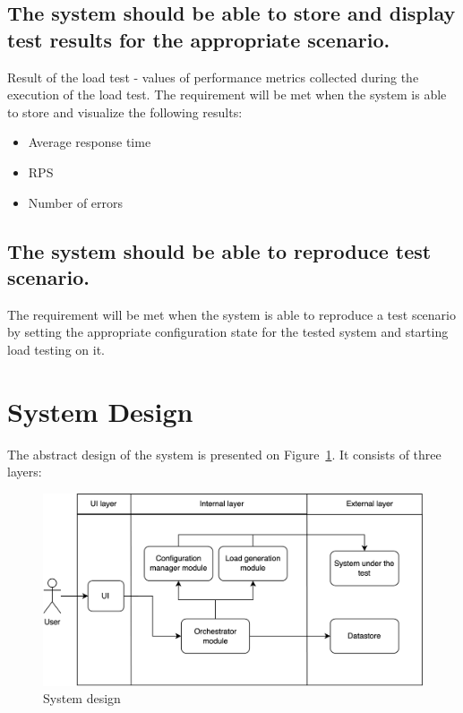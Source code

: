 \subsection{The system should be able to store and display test results for the appropriate scenario.}\label{subsec:fr:store_results}
Result of the load test - values of performance metrics collected during the execution of the load test.
The requirement will be met when the system is able to store and visualize the following results:
\begin{itemize}
    \item Average response time
    \item RPS
    \item Number of errors
\end{itemize}

\subsection{The system should be able to reproduce test scenario.}\label{subsec:fr:reproduce}
The requirement will be met when the system is able to reproduce a test scenario by setting the appropriate configuration state for the tested system and starting load testing on it.


\section{System Design}\label{sec:system_design}
The abstract design of the system is presented on Figure~\ref{fig:design}. It consists of three layers:

\begin{figure}[t]
    \centering
    \includegraphics[height=\textheight,width=\textwidth,keepaspectratio]{design.png}
    \caption{System design}
    \label{fig:design}
\end{figure}

